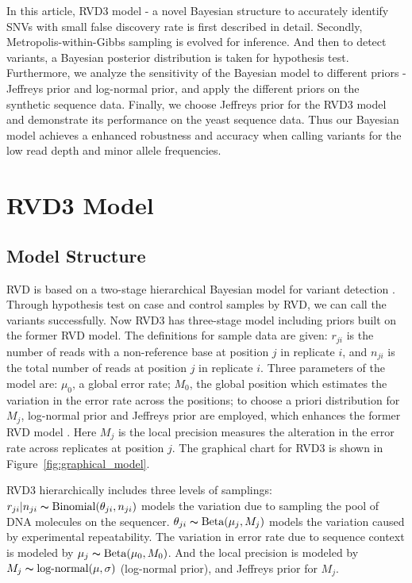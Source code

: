 \documentclass{bioinfo}
\begin{document}
In this article, RVD3 model - a novel Bayesian structure to accurately identify SNVs with small false discovery rate is first described in detail.
Secondly, Metropolis-within-Gibbs sampling is evolved for inference. And then to detect variants, a Bayesian posterior distribution is taken for hypothesis test.
Furthermore, we analyze the sensitivity of the Bayesian model to different priors - Jeffreys prior and log-normal prior, and apply the different priors on the synthetic sequence data.
Finally, we choose Jeffreys prior for the RVD3 model and demonstrate its performance on the yeast sequence data.
Thus our Bayesian model achieves a enhanced robustness and accuracy when calling variants for the low read depth and minor allele frequencies.

\section{RVD3 Model}

\subsection{Model Structure}\label{sec:model_structure}
RVD is based on a two-stage hierarchical Bayesian model for variant detection \citep{Flaherty:2011ja}. Through hypothesis test on case and control samples by RVD, we can call the variants successfully.
Now RVD3 has three-stage model including priors built on the former RVD model.
The definitions for sample data are given: $r_{ji}$ is the number of reads with a non-reference base at position $j$ in replicate $i$, and $n_{ji}$ is the total number of reads at position $j$ in replicate $i$.
Three parameters of the model are: $\mu_0$, a global error rate; $M_0$, the global position which estimates the variation in the error rate across the positions;
to choose a priori distribution for $M_j$, log-normal prior and Jeffreys prior \citep{jeffreys1946invariant} are employed, which enhances the former RVD model \citep{Flaherty:2011ja}.
Here $M_j$ is the local precision measures the alteration in the error rate across replicates at position $j$. The graphical chart for RVD3 is shown in Figure~\ref{fig:graphical_model}.

RVD3 hierarchically includes three levels of samplings: $r_{ji} | n_{ji} \thicksim \text{Binomial}(\theta_{ji}, n_{ji})$ models the variation due to sampling the pool of DNA molecules on the sequencer.
$\theta_{ji} \thicksim \text{Beta}(\mu_j, M_j)$ models the variation caused by experimental repeatability. The variation in error rate due to sequence context is modeled by $\mu_j \thicksim \text{Beta}(\mu_0, M_0)$.
And the local precision is modeled by $ M_{j} \thicksim \text{log-normal}(\mu, \sigma)$ (log-normal prior), and Jeffreys prior for $M_j$.
\end{document}
